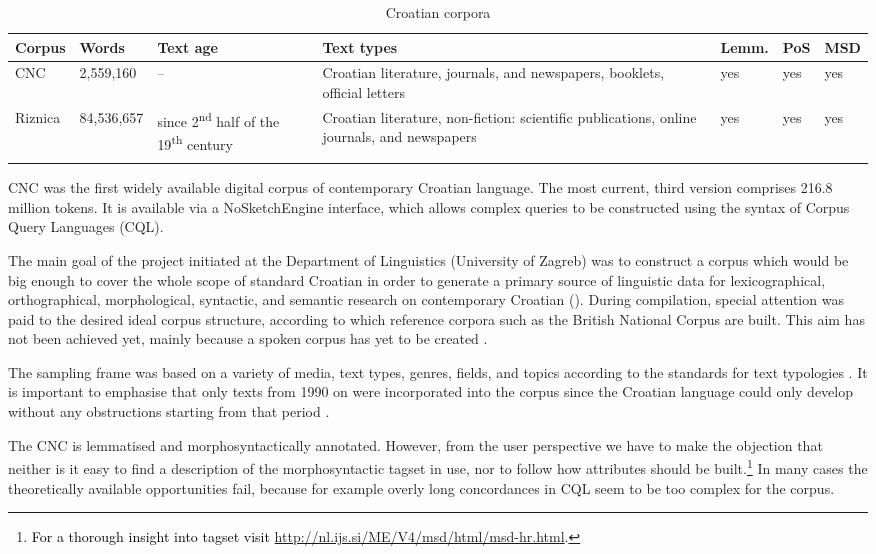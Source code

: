 \begin{table}
\caption{Croatian corpora}
\label{table:cro1}
\centering
\begin{tabularx}{.97\textwidth}{ll>{\raggedright\arraybackslash}X>{\raggedright\arraybackslash}Xlll}
\lsptoprule
Corpus	&	Words		&	Text age	&	Text types												&	Lemm.		&	PoS	&	MSD \\
\midrule
CNC		&	2,559,160	&	1990--								&Croatian literature, journals, and newspapers, booklets, official letters 	&	yes	&	yes	&	yes\\
Riznica	&	84,536,657	&	since 2\textsuperscript{nd} half of the 19\textsuperscript{th} century		&Croatian literature, non-fiction: scientific publications, online journals, and newspapers 	&	yes	&	yes	&	yes\\
\lspbottomrule
\end{tabularx}
\end{table}

CNC was the first widely available digital corpus of contemporary Croatian language. The most current, third version comprises 216.8 million tokens. It is available via a NoSketchEngine interface, which allows complex queries to be constructed using the syntax of Corpus Query Languages (CQL).

The main goal of the project initiated at the Department of Linguistics (University of Zagreb) was to construct a corpus which would be big enough to cover the whole scope of standard Croatian in order to generate a primary source of linguistic data for lexicographical, orthographical, morphological, syntactic, and semantic research on contemporary Croatian (\citealt[339]{Tadic98}). During compilation, special attention was paid to the desired ideal corpus structure, according to which reference corpora such as the British National Corpus are built. This aim has not been achieved yet, mainly because a spoken corpus has yet to be created \parencites[346]{Tadic98}[446]{Tadic02}.

The sampling frame was based on a variety of media, text types, genres, fields, and topics \citep[442]{Tadic02} according to the standards for text typologies \citep{eagles96}. It is important to emphasise that only texts from 1990 on were incorporated into the corpus since the Croatian language could only develop without any obstructions starting from that period \citep[442]{Tadic02}.

The CNC is lemmatised and morphosyntactically annotated. However, from the user perspective we have to make the objection that neither is it easy to find a description of  the morphosyntactic tagset in use, nor to follow how attributes should be built.\footnote{\textcolor{black}{For a thorough insight into tagset visit} \url{http://nl.ijs.si/ME/V4/msd/html/msd-hr.html}.} In many cases the theoretically available opportunities fail, because for example overly long concordances in CQL seem to be too complex for the corpus.

